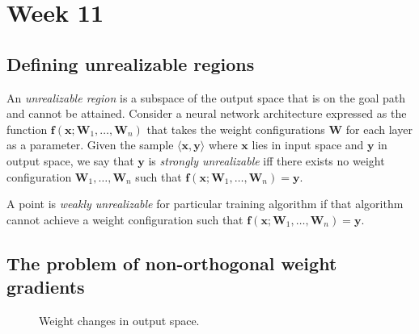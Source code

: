\documentclass{article}
\renewcommand\vec{\mathbf}
\begin{document}
\section{Week 11}
\subsection{Defining unrealizable regions}
An \textit{unrealizable region} is a subspace of the output space that is on the goal path and cannot be attained. 
Consider a neural network architecture expressed as the function $\vec{f}(\vec{x}; \vec{W}_1, \dots, \vec{W}_n)$ that takes the weight configurations $\vec{W}$ for each layer as a parameter.
Given the sample $\langle \vec{x}, \vec{y}\rangle$ where $\vec{x}$ lies in input space and $\vec{y}$ in output space, we say that $\vec{y}$ is \textit{strongly unrealizable} iff there exists no weight configuration $\vec{W}_1,\dots,\vec{W}_n$ such that $\vec{f}(\vec{x};\vec{W}_1,\dots,\vec{W}_n)=\vec{y}$. 

A point is \textit{weakly unrealizable} for particular training algorithm if that algorithm cannot achieve a weight configuration such that $\vec{f}(\vec{x};\vec{W}_1,\dots,\vec{W}_n)=\vec{y}$.

\subsection{The problem of non-orthogonal weight gradients}
\label{sec:week11:orthogonal}

\begin{wrapfigure}{r}{.5\textwidth}
    \centering
    \caption{Weight changes in output space.}
    \label{fig:week11:orthogonal}
\end{wrapfigure}
\end{document}
